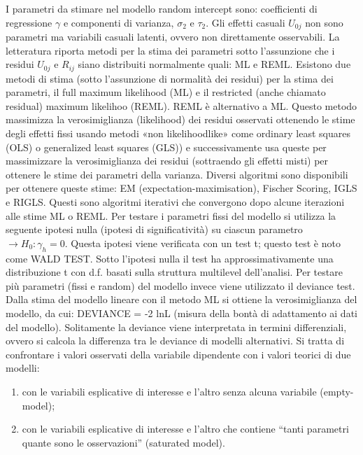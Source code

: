\documentclass[a4page, 11pt]{article} %
\begin{document}
I parametri da stimare nel modello random intercept sono: coefficienti di regressione $\gamma$ e componenti di varianza, $\sigma_2$ e $\tau_2$. Gli effetti casuali $U_{0j}$ non sono parametri ma variabili casuali latenti, ovvero non direttamente osservabili. La letteratura riporta metodi per la stima dei parametri sotto l’assunzione che i residui $U_{0j}$ e $R_{ij}$ siano distribuiti normalmente quali: ML e REML. Esistono due metodi di stima (sotto l’assunzione di normalità dei residui) per la stima dei parametri, il full maximum likelihood (ML) e il restricted (anche chiamato residual) maximum likelihoo (REML).
\newline
REML è alternativo a ML. Questo metodo massimizza la verosimiglianza (likelihood) dei residui osservati ottenendo le stime degli effetti fissi usando metodi «non likelihoodlike» come ordinary least squares (OLS) o generalized least squares (GLS)) e successivamente usa queste per massimizzare la verosimiglianza dei residui (sottraendo gli effetti misti) per ottenere le stime dei parametri della varianza. Diversi algoritmi sono disponibili per ottenere queste stime: EM (expectation-maximisation), Fischer Scoring, IGLS e RIGLS. Questi sono algoritmi iterativi che convergono dopo alcune iterazioni alle stime ML o REML.
Per testare i parametri fissi del modello si utilizza la seguente ipotesi nulla (ipotesi di significatività) su ciascun parametro $\rightarrow H_0: \gamma_h = 0$.
\newline
Questa ipotesi viene verificata con un test t; questo test è noto come WALD TEST. Sotto l’ipotesi nulla il test ha approssimativamente una distribuzione t con d.f. basati sulla struttura multilevel dell’analisi. Per testare più parametri (fissi e random) del modello invece viene utilizzato il deviance test. Dalla stima del modello lineare con il metodo ML si ottiene la verosimiglianza del modello, da cui: DEVIANCE = -2 lnL (misura della bontà di adattamento ai dati del modello).
\newline
Solitamente la deviance viene interpretata in termini differenziali, ovvero si calcola la differenza tra le deviance di modelli alternativi. Si tratta di confrontare i valori osservati della variabile dipendente con i valori teorici di due modelli: 
\begin{enumerate}[noitemsep]
\item con le variabili esplicative di interesse e l’altro senza alcuna variabile (empty-model); 
\item con le variabili esplicative di interesse e l’altro che contiene “tanti parametri quante sono le osservazioni” (saturated model).
\end{enumerate}
\end{document}
